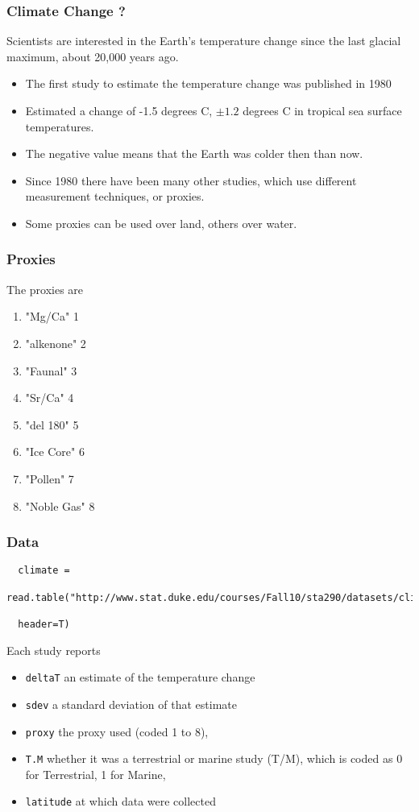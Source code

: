 \documentclass[]{beamer}
\begin{document}
\begin{frame}
  \frametitle{Climate Change ?}
  Scientists are interested in the Earth's temperature change since the last 
glacial maximum, about 20,000 years ago. \pause
\begin{itemize}
\item  The first study to estimate the 
temperature change was published in 1980 \pause
\item  Estimated a change of -1.5 
degrees C, $\pm 1.2$ degrees C in tropical sea surface temperatures.  \pause
\item The 
negative value means that the Earth was colder then than now.  \pause
\item Since 1980 
there have been many other studies, which use different 
measurement techniques, or proxies.  \pause
\item Some proxies can be used over land, 
others over water. 
\end{itemize}


\end{frame}

\begin{frame}
  \frametitle{Proxies}
   The proxies are

   \begin{enumerate}
   \item      "Mg/Ca"           1
   \item     "alkenone"        2
   \item        "Faunal"          3
   \item             "Sr/Ca"           4
   \item            "del 180"         5
   \item             "Ice Core"        6
   \item             "Pollen"          7
   \item             "Noble Gas"       8
   \end{enumerate}

\end{frame}
\begin{frame}[fragile]
  \frametitle{Data}
  \begin{tiny}
\begin{verbatim}
  climate =
  read.table("http://www.stat.duke.edu/courses/Fall10/sta290/datasets/climate.dat",

  header=T)  
\end{verbatim}
    
  \end{tiny}
\pause
Each study reports
\begin{itemize}
\item {\tt deltaT} an estimate of the temperature change \pause
\item {\tt sdev}  a standard deviation of that
estimate \pause
\item {\tt proxy}  the proxy used (coded 1 to 8),  \pause
\item {\tt T.M} whether it was a
terrestrial or marine study (T/M), which is coded as 0 for
Terrestrial, 1 for Marine,  \pause
\item {\tt latitude} at which data were collected 
\end{itemize}
\end{frame}
\end{document}
